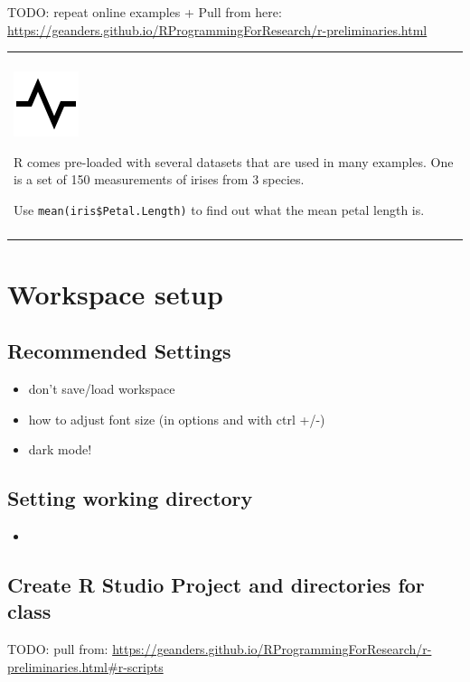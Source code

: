 \documentclass[
]{book}
\providecommand{\tightlist}{%
  \setlength{\itemsep}{0pt}\setlength{\parskip}{0pt}}
\newenvironment{progress}
{
  \begin{center}
  \begin{tabular}{|>{\columncolor{progress}}p{0.9\textwidth}|}
  \hline\\
  \includegraphics[scale=0.1]{src/images/pulse-line.png}
}
{\\\\\hline
  \end{tabular}
  \end{center}
}
\begin{document}
TODO: repeat online examples + Pull from here: \url{https://geanders.github.io/RProgrammingForResearch/r-preliminaries.html}

\begin{progress}
R comes pre-loaded with several datasets that are used in many examples.
One is a set of 150 measurements of irises from 3 species.

Use \texttt{mean(iris\$Petal.Length)} to find out what the mean petal
length is.
\end{progress}

\hypertarget{workspace-setup}{%
\section{Workspace setup}\label{workspace-setup}}

\hypertarget{recommended-settings}{%
\subsection{Recommended Settings}\label{recommended-settings}}

\begin{itemize}
\tightlist
\item
  don't save/load workspace
\item
  how to adjust font size (in options and with ctrl +/-)
\item
  dark mode!
\end{itemize}

\hypertarget{setting-working-directory}{%
\subsection{Setting working directory}\label{setting-working-directory}}

\begin{itemize}
\item
\end{itemize}

\hypertarget{create-r-studio-project-and-directories-for-class}{%
\subsection{Create R Studio Project and directories for class}\label{create-r-studio-project-and-directories-for-class}}

TODO: pull from: \url{https://geanders.github.io/RProgrammingForResearch/r-preliminaries.html\#r-scripts}
\end{document}

